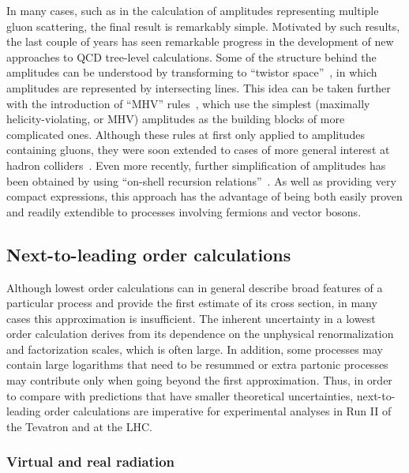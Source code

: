 \documentclass[12pt]{iopart}
\begin{document}
In many cases, such as in the calculation of amplitudes representing multiple
gluon scattering, the final result is remarkably simple. Motivated by such
results, the last couple of years has seen remarkable progress in the
development of new approaches to QCD tree-level calculations. Some of the
structure behind the amplitudes can be understood by transforming to ``twistor
space''~\cite{Witten:2003nn}, in which amplitudes are represented by
intersecting lines. This idea can be taken further with the introduction of
``MHV'' rules~\cite{Cachazo:2004kj}, which use the simplest
(maximally helicity-violating, or MHV) amplitudes as the building blocks of
more complicated ones. Although these rules at first only applied to
amplitudes containing gluons, they were soon extended to cases of more
general interest at hadron colliders~\cite{Georgiou:2004wu,Wu:2004jx,
Georgiou:2004by,Dixon:2004za,Badger:2004ty,Bern:2004ba}.
Even more recently, further simplification of amplitudes has been obtained
by using ``on-shell recursion relations''~\cite{Britto:2004ap,Britto:2005fq}.
As well as providing very compact expressions, this approach has the advantage
of being both easily proven and readily extendible to processes involving
fermions and vector bosons.


\subsection{Next-to-leading order calculations}
\label{sec:nlo}

Although lowest order calculations can in general describe broad features of
a particular process and provide the first estimate of its cross section, in
many cases this approximation is insufficient. The inherent uncertainty in
a lowest order calculation derives from its dependence on the unphysical
renormalization and factorization scales, which is often large. In addition,
some processes may contain large logarithms that need to be resummed or extra
partonic processes may contribute only when going beyond the first
approximation. Thus, in order to compare with predictions that have smaller
theoretical uncertainties, next-to-leading order calculations are imperative
for experimental analyses in Run II of the Tevatron and at the LHC.

\subsubsection{Virtual and real radiation}
\label{sec:virtreal}
\end{document}
